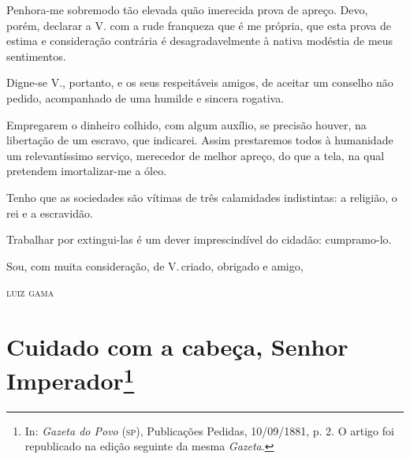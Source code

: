 {Penhora-me sobremodo tão elevada quão imerecida prova de apreço. Devo,
porém, declarar a V. com a rude franqueza que é me própria, que esta
prova de estima e consideração contrária é desagradavelmente à nativa
modéstia de meus sentimentos.

Digne-se V., portanto, e os seus respeitáveis amigos, de aceitar um
conselho não pedido, acompanhado de uma humilde e sincera rogativa.

Empregarem o dinheiro colhido, com algum auxílio, se precisão houver, na
libertação de um escravo, que indicarei. Assim prestaremos todos à
humanidade um relevantíssimo serviço, merecedor de melhor apreço, do que
a tela, na qual pretendem imortalizar-me a óleo.

Tenho que as sociedades são vítimas de três calamidades indistintas: a
religião, o rei e a escravidão.

Trabalhar por extingui-las é um dever imprescindível do cidadão:
cumpramo-lo.

Sou, com muita consideração, de V.\,criado, obrigado e amigo,\medskip

\hfill\textsc{luiz gama}

\chapter{Cuidado com a cabeça, Senhor Imperador\footnote{In:
  \emph{Gazeta do Povo} (\textsc{sp}), Publicações Pedidas, 10/09/1881, p. 2. O
  artigo foi republicado na edição seguinte da mesma \emph{Gazeta}.}}

}
